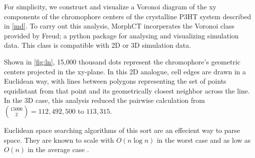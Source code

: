 For simplicity, we construct and visualize a Voronoi diagram of the xy components of the chromophore centers
of the crystalline P3HT system described in \autoref{md}. To carry out this analysis, MorphCT incorperates the
Voronoi class provided by Freud; a python package for analysing and visualizing simulation data\cite{Ramasubramani2020}. 
This class is compatible with 2D or 3D simulation data. 

Shown in \autoref{fig:ln}, 15,000 thousand dots represent the chromophore's geometric centers projected
in the xy-plane. In this 2D analogue,
cell edges are drawn in a Euclidean way, with lines between polygons representing the set of points 
equidistant from that point and its geometrically closest neighbor across the line. 
In the 3D case, this analysis reduced the pairwise calculation from ${15000 \choose 2} = 112,492,500$
to $113,315$. 

Euclidean space searching algorithms of this sort are an effecient way to parse space. 
They are known to scale with $O(n\log{n})$ in the worst case and as low as $O(n)$ in the average case
\cite{Bentley1980}.


